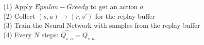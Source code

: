 \documentclass{article}
\begin{document}
\begin{flushleft}
(1) Apply $Epsilon-Greedy$ to get an action $a$ \\
(2) Collect $(s, a) \rightarrow (r, s')$ for the replay buffer \\
(3) Train the Neural Network with samples from the replay buffer \\
(4) Every $N$ steps: $\hat{Q_{s, a}} = Q_{s, a}$
\end{flushleft}
\end{document}
